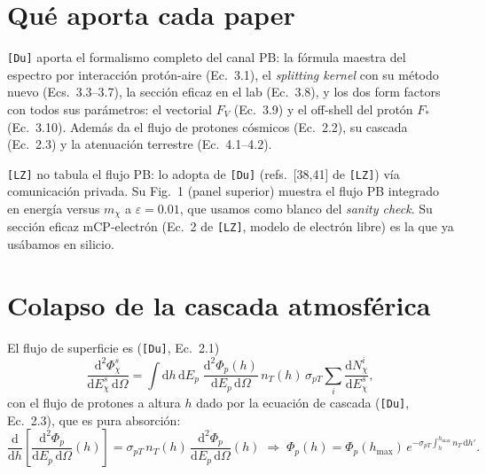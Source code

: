\documentclass[11pt,a4paper]{article}
\newcommand{\mchi}{m_\chi}
\newcommand{\eps}{\varepsilon}
\newcommand{\Phip}{\Phi_p}
\newcommand{\dd}{\mathrm{d}}
\newcommand{\Du}{\texttt{[Du]}}
\newcommand{\LZ}{\texttt{[LZ]}}
\begin{document}
\section{Qu\'e aporta cada paper}

\Du{} aporta el formalismo completo del canal PB: la f\'ormula maestra del
espectro por interacci\'on prot\'on-aire (Ec.~3.1), el \emph{splitting kernel}
con su m\'etodo nuevo (Ecs.~3.3--3.7), la secci\'on eficaz en el lab (Ec.~3.8),
y los dos form factors con todos sus par\'ametros: el vectorial $F_V$
(Ec.~3.9) y el off-shell del prot\'on $F_\ast$ (Ec.~3.10). Adem\'as da el flujo
de protones c\'osmicos (Ec.~2.2), su cascada (Ec.~2.3) y la atenuaci\'on
terrestre (Ec.~4.1--4.2).

\LZ{} no tabula el flujo PB: lo adopta de \Du{} (refs.~[38,41] de \LZ) v\'ia
comunicaci\'on privada. Su Fig.~1 (panel superior) muestra el flujo PB
integrado en energ\'ia versus $\mchi$ a $\eps=0.01$, que usamos como blanco
del \emph{sanity check}. Su secci\'on eficaz mCP-electr\'on (Ec.~2 de \LZ,
modelo de electr\'on libre) es la que ya us\'abamos en silicio.

\section{Colapso de la cascada atmosf\'erica}

El flujo de superficie es (\Du, Ec.~2.1)
\begin{equation}
\frac{\dd^2\Phi_\chi^s}{\dd E_\chi^s\,\dd\Omega}
= \int \dd h\,\dd E_p\;
\frac{\dd^2\Phip(h)}{\dd E_p\,\dd\Omega}\,
n_T(h)\,\sigma_{pT}\sum_i \frac{\dd N_\chi^i}{\dd E_\chi^s},
\label{eq:flux_master}
\end{equation}
con el flujo de protones a altura $h$ dado por la ecuaci\'on de cascada
(\Du, Ec.~2.3), que es pura absorci\'on:
\begin{equation}
\frac{\dd}{\dd h}\!\left[\frac{\dd^2\Phip}{\dd E_p\,\dd\Omega}(h)\right]
= \sigma_{pT}\,n_T(h)\,\frac{\dd^2\Phip}{\dd E_p\,\dd\Omega}(h)
\;\Rightarrow\;
\Phip(h)=\Phip(h_{\max})\,e^{-\sigma_{pT}\int_h^{h_{\max}} n_T\,\dd h'} .
\label{eq:cascade}
\end{equation}
\end{document}

